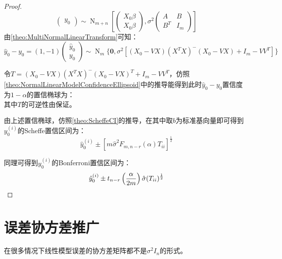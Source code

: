 \begin{proof}
\begin{equation*}
\begin{pmatrix}
			y_0
		\end{pmatrix}\sim\operatorname{N}_{m+n}\left[
		\begin{pmatrix}
			X_0\beta \\
			X_0\beta
		\end{pmatrix},\sigma^2
		\begin{pmatrix}
			A & B \\
			B^T & I_m
		\end{pmatrix}
		\right]
	\end{equation*}
	由\cref{theo:MultiNormalLinearTransform}可知：
	\begin{equation*}
		\hat{y}_0-y_0=
		(1,-1)
		\begin{pmatrix}
			\hat{y}_0 \\
			y_0
		\end{pmatrix}\sim\operatorname{N}_m\{
		\mathbf{0},\sigma^2[(X_0-VX)(X^TX)^-(X_0-VX)+I_m-VV^T]\}
	\end{equation*}\par
	令$T=(X_0-VX)(X^TX)^-(X_0-VX)^T+I_m-VV^T$，仿照\cref{theo:NormalLinearModelConfidenceEllipsoid}中的推导能得到此时$\hat{y}_0-y_0$置信度为$1-\alpha$的置信椭球为：
	\begin{equation*}
		[\hat{y}_0-y_0:(\hat{y}_0-y_0)^T(T)^{-1}(\hat{y}_0-y_0)\leqslant m\hat{\sigma}^2F_{m,n-r}(\alpha)]
	\end{equation*}
	其中$T$的可逆性由保证。\par
	由上述置信椭球，仿照\cref{theo:ScheffeCI}的推导，在其中取$b$为标准基向量即可得到$y_0^{(i)}$的Scheffe置信区间为：
	\begin{equation*}
		\hat{y}_0^{(i)}\pm[m\hat{\sigma}^2F_{m,n-r}(\alpha)T_{ii}]^{\frac{1}{2}}
	\end{equation*}\par
	同理可得到$y_0^{(i)}$的Bonferroni置信区间为：
	\begin{equation*}
		\hat{y}_0^{(i)}\pm t_{n-r}\left(\frac{\alpha}{2m}\right)\hat{\sigma}(T_{ii})^{\frac{1}{2}}\qedhere
	\end{equation*}
\end{proof}


\section{误差协方差推广}
在很多情况下线性模型误差的协方差矩阵都不是$\sigma^2I_n$的形式。

